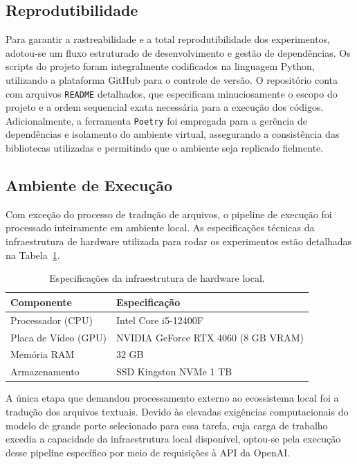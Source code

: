 \documentclass[manuscript,screen]{acmart}
\begin{document}
\subsection{Reprodutibilidade}

Para garantir a rastreabilidade e a total reprodutibilidade dos experimentos, adotou-se um fluxo estruturado de desenvolvimento e gestão de dependências. Os scripts do projeto foram integralmente codificados na linguagem Python, utilizando a plataforma GitHub para o controle de versão. O repositório conta com arquivos \texttt{README} detalhados, que especificam minuciosamente o escopo do projeto e a ordem sequencial exata necessária para a execução dos códigos. Adicionalmente, a ferramenta \texttt{Poetry} foi empregada para a gerência de dependências e isolamento do ambiente virtual, assegurando a consistência das bibliotecas utilizadas e permitindo que o ambiente seja replicado fielmente.

\subsection{Ambiente de Execução}

Com exceção do processo de tradução de arquivos, o pipeline de execução foi processado inteiramente em ambiente local. As especificações técnicas da infraestrutura de hardware utilizada para rodar os experimentos estão detalhadas na Tabela~\ref{tab:ambiente_hardware}.

\begin{table}[htbp]
\centering
\caption{Especificações da infraestrutura de hardware local.}
\label{tab:ambiente_hardware}
\begin{tabular}{ll}
\hline
\textbf{Componente} & \textbf{Especificação} \\ \hline
Processador (CPU)   & Intel Core i5-12400F \\
Placa de Vídeo (GPU) & NVIDIA GeForce RTX 4060 (8 GB VRAM) \\
Memória RAM         & 32 GB \\
Armazenamento       & SSD Kingston NVMe 1 TB \\ \hline
\end{tabular}
\end{table}

A única etapa que demandou processamento externo ao ecossistema local foi a tradução dos arquivos textuais. Devido às elevadas exigências computacionais do modelo de grande porte selecionado para essa tarefa, cuja carga de trabalho excedia a capacidade da infraestrutura local disponível, optou-se pela execução desse pipeline específico por meio de requisições à API da OpenAI.
\end{document}
